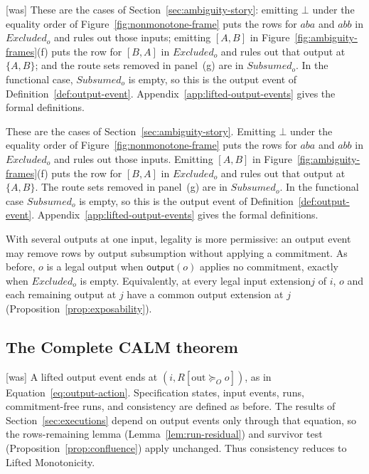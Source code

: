 \documentclass[sigconf]{cidr-2027}
\theoremstyle{remark}
\newcommand{\OutputGe}{\succeq_O}
\newcommand{\commitment}{commitment\xspace}
\newcommand{\indesc}{input extension\xspace} %
\newcommand{\outnoun}{output extension\xspace}%
\newcommand{\Subsumed}{\mathit{Subsumed}}
\newcommand{\Excluded}{\mathit{Excluded}}
\begin{document}
{\footnotesize\color{black!50}\noindent\textsf{[was]} These are the cases of Section~\ref{sec:ambiguity-story}: emitting $\bot$ under
the equality order of Figure~\ref{fig:nonmonotone-frame} puts the rows for
$aba$ and $abb$ in $\Excluded_o$ and rules out those inputs; emitting $[A,B]$
in Figure~\ref{fig:ambiguity-frames}(f) puts the row for $[B,A]$ in
$\Excluded_o$ and rules out that output at $\{A,B\}$; and the route sets removed
in panel~(g) are in $\Subsumed_o$.  In the functional case, $\Subsumed_o$ is
empty, so this is the output event of Definition~\ref{def:output-event}.
Appendix~\ref{app:lifted-output-events} gives the formal definitions.\par}

\color{blue!70!black}These are the cases of Section~\ref{sec:ambiguity-story}.  Emitting $\bot$
under the equality order of Figure~\ref{fig:nonmonotone-frame} puts the rows
for $aba$ and $abb$ in $\Excluded_o$ and rules out those inputs.  Emitting
$[A,B]$ in Figure~\ref{fig:ambiguity-frames}(f) puts the row for $[B,A]$ in
$\Excluded_o$ and rules out that output at $\{A,B\}$.  The route sets removed in
panel~(g) are in $\Subsumed_o$.  In the functional case $\Subsumed_o$ is empty,
so this is the output event of Definition~\ref{def:output-event}.
Appendix~\ref{app:lifted-output-events} gives the formal definitions.\color{black}

With several outputs at one input, legality is more permissive: an output
event may remove rows by output subsumption without applying a \commitment.
As before, $o$ is a legal output when $\mathsf{output}(o)$ applies no
\commitment, exactly when $\Excluded_o$ is empty.  Equivalently, at every legal
\indesc $j$ of $i$, $o$ and each remaining output at $j$ have a common
\outnoun at $j$ (Proposition~\ref{prop:exposability}).

\subsection{The Complete CALM theorem}
\label{sec:complete-calm-theorem}



{\footnotesize\color{black!50}\noindent\textsf{[was]} A lifted output event ends at $(i,R[\mathrm{out}\OutputGe o])$, as in
Equation~\ref{eq:output-action}.  Specification states, input events, runs,
\commitment-free runs, and consistency are defined as before.  The results of
Section~\ref{sec:executions} depend on output events only through that equation,
so the rows-remaining lemma (Lemma~\ref{lem:run-residual}) and survivor test
(Proposition~\ref{prop:confluence}) apply unchanged.  Thus consistency reduces
to Lifted Monotonicity.\par}
\end{document}

